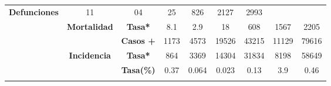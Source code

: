 \begin{tabular}{ccc|cccccc|}
		\multirow{-2}{*}{\cellcolor[HTML]{FFFFC7}\textbf{Defunciones}} &
		\multicolumn{1}{c|}{\multirow{-2}{*}{\cellcolor[HTML]{FFFFC7}11}} &
		\multicolumn{1}{c|}{\multirow{-2}{*}{\cellcolor[HTML]{FFFFC7}04}} &
		\multicolumn{1}{c|}{\multirow{-2}{*}{\cellcolor[HTML]{FFFFC7}25}} &
		\multicolumn{1}{c|}{\multirow{-2}{*}{\cellcolor[HTML]{FFFFC7}826}} &
		\multicolumn{1}{c|}{\multirow{-2}{*}{\cellcolor[HTML]{FFFFC7}2127}} &
		\multirow{-2}{*}{\cellcolor[HTML]{FFFFC7}2993} \\ \cline{3-9} 
		\rowcolor[HTML]{FFFFC7} 
		\multicolumn{1}{|c|}{\cellcolor[HTML]{FFFFC7}} &
		\multicolumn{1}{c|}{\multirow{-2}{*}{\cellcolor[HTML]{FFFFC7}\textbf{Mortalidad}}} &
		\textbf{Tasa*} &
		\multicolumn{1}{c|}{\cellcolor[HTML]{FFFFC7}8.1} &
		\multicolumn{1}{c|}{\cellcolor[HTML]{FFFFC7}2.9} &
		\multicolumn{1}{c|}{\cellcolor[HTML]{FFFFC7}18} &
		\multicolumn{1}{c|}{\cellcolor[HTML]{FFFFC7}608} &
		\multicolumn{1}{c|}{\cellcolor[HTML]{FFFFC7}1567} &
		2205 \\ \cline{2-9} 
		\rowcolor[HTML]{FFFFC7} 
		\multicolumn{1}{|c|}{\cellcolor[HTML]{FFFFC7}} &
		\multicolumn{1}{c|}{\cellcolor[HTML]{FFFFC7}} &
		\textbf{Casos +} &
		\multicolumn{1}{c|}{\cellcolor[HTML]{FFFFC7}1173} &
		\multicolumn{1}{c|}{\cellcolor[HTML]{FFFFC7}4573} &
		\multicolumn{1}{c|}{\cellcolor[HTML]{FFFFC7}19526} &
		\multicolumn{1}{c|}{\cellcolor[HTML]{FFFFC7}43215} &
		\multicolumn{1}{c|}{\cellcolor[HTML]{FFFFC7}11129} &
		79616 \\ \cline{3-9} 
		\rowcolor[HTML]{FFFFC7} 
		\multicolumn{1}{|c|}{\multirow{-6}{*}{\cellcolor[HTML]{FFFFC7}\textbf{2021}}} &
		\multicolumn{1}{c|}{\multirow{-2}{*}{\cellcolor[HTML]{FFFFC7}\textbf{Incidencia}}} &
		\textbf{Tasa*} &
		\multicolumn{1}{c|}{\cellcolor[HTML]{FFFFC7}864} &
		\multicolumn{1}{c|}{\cellcolor[HTML]{FFFFC7}3369} &
		\multicolumn{1}{c|}{\cellcolor[HTML]{FFFFC7}14304} &
		\multicolumn{1}{c|}{\cellcolor[HTML]{FFFFC7}31834} &
		\multicolumn{1}{c|}{\cellcolor[HTML]{FFFFC7}8198} &
		58649 \\ \hline
		\rowcolor[HTML]{E2EFDA} 
		\multicolumn{1}{|c|}{\cellcolor[HTML]{E2EFDA}} &
		\multicolumn{1}{c|}{\cellcolor[HTML]{E2EFDA}} &
		\textbf{Tasa(\%)} &
		\multicolumn{1}{c|}{\cellcolor[HTML]{E2EFDA}0.37} &
		\multicolumn{1}{c|}{\cellcolor[HTML]{E2EFDA}0.064} &
		\multicolumn{1}{c|}{\cellcolor[HTML]{E2EFDA}0.023} &
		\multicolumn{1}{c|}{\cellcolor[HTML]{E2EFDA}0.13} &
		\multicolumn{1}{c|}{\cellcolor[HTML]{E2EFDA}3.9} &
		0.46 \\ \cline{3-9} 
		\rowcolor[HTML]{E2EFDA} 
		\multicolumn{1}{|c|}{\cellcolor[HTML]{E2EFDA}} &

\end{tabular}
